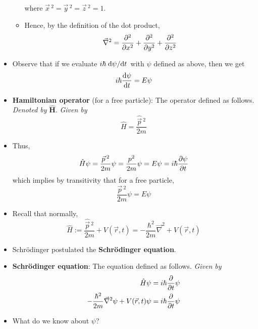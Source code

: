 \documentclass[../notes.tex]{subfiles}
\begin{document}
\begin{itemize}
\begin{itemize}
\begin{equation*}
        \end{equation*}
        where $\vec{x}{\,}^2=\vec{y}{\,}^2=\vec{z}{\,}^2=1$.
        \item Hence, by the definition of the dot product,
        \begin{equation*}
            \vec{\nabla}^2 = \pdv[2]{x}+\pdv[2]{y}+\pdv[2]{z}
        \end{equation*}
    \end{itemize}
    \item Observe that if we evaluate $i\hbar\dv*{\psi}{t}$ with $\psi$ defined as above, then we get
    \begin{equation*}
        i\hbar\dv{\psi}{t} = E\psi
    \end{equation*}
    \item \textbf{Hamiltonian operator} (for a free particle): The operator defined as follows. \emph{Denoted by} $\bm{\hat{H}}$. \emph{Given by}
    \begin{equation*}
        \hat{H} = \frac{\hat{\vec{p}}{\,}^2}{2m}
    \end{equation*}
    \item Thus,
    \begin{equation*}
        \hat{H}\psi = \frac{\vec{p}{\,}^2}{2m}\psi
        = \frac{p^2}{2m}\psi
        = E\psi
        = i\hbar\pdv{\psi}{t}
    \end{equation*}
    which implies by transitivity that for a free particle,
    \begin{equation*}
        \frac{\vec{p}{\,}^2}{2m}\psi = E\psi
    \end{equation*}
    \item Recall that normally,
    \begin{equation*}
        \hat{H} := \frac{\hat{\vec{p}}{\,}^2}{2m}+V(\vec{r},t)
        = -\frac{\hbar^2}{2m}\vec{\nabla}^2+V(\vec{r},t)
    \end{equation*}
    \item Schr\"{o}dinger postulated the \textbf{Schr\"{o}dinger equation}.
    \item \textbf{Schr\"{o}dinger equation}: The equation defined as follows. \emph{Given by}
    \begin{align*}
        \hat{H}\psi &= i\hbar\pdv{t}\psi\\
        -\frac{\hbar^2}{2m}\vec{\nabla}^2\psi+V(\vec{r},t)\psi &= i\hbar\pdv{t}\psi
    \end{align*}
    \item What do we know about $\psi$?
    \begin{itemize}

\end{itemize}
\end{itemize}
\end{document}
